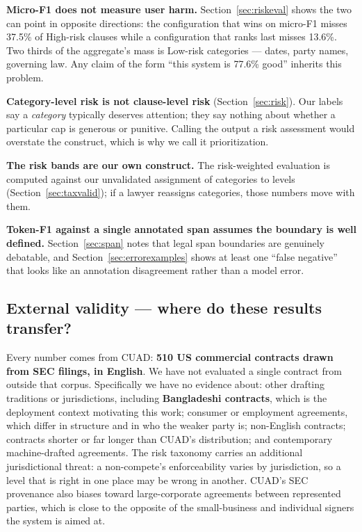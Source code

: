 \textbf{Micro-F1 does not measure user harm.} Section~\ref{sec:riskeval} shows the two can point in opposite directions: the configuration that wins on micro-F1 misses 37.5\% of High-risk clauses while a configuration that ranks last misses 13.6\%. Two thirds of the aggregate's mass is Low-risk categories --- dates, party names, governing law. Any claim of the form ``this system is 77.6\% good'' inherits this problem.

\textbf{Category-level risk is not clause-level risk} (Section~\ref{sec:risk}). Our labels say a \emph{category} typically deserves attention; they say nothing about whether a particular cap is generous or punitive. Calling the output a risk assessment would overstate the construct, which is why we call it prioritization.

\textbf{The risk bands are our own construct.} The risk-weighted evaluation is computed against our unvalidated assignment of categories to levels (Section~\ref{sec:taxvalid}); if a lawyer reassigns categories, those numbers move with them.

\textbf{Token-F1 against a single annotated span assumes the boundary is well defined.} Section~\ref{sec:span} notes that legal span boundaries are genuinely debatable, and Section~\ref{sec:errorexamples} shows at least one ``false negative'' that looks like an annotation disagreement rather than a model error.

\subsection{External validity --- where do these results transfer?}
Every number comes from CUAD: \textbf{510 US commercial contracts drawn from SEC filings, in English}. We have not evaluated a single contract from outside that corpus. Specifically we have no evidence about: other drafting traditions or jurisdictions, including \textbf{Bangladeshi contracts}, which is the deployment context motivating this work; consumer or employment agreements, which differ in structure and in who the weaker party is; non-English contracts; contracts shorter or far longer than CUAD's distribution; and contemporary machine-drafted agreements. The risk taxonomy carries an additional jurisdictional threat: a non-compete's enforceability varies by jurisdiction, so a level that is right in one place may be wrong in another. CUAD's SEC provenance also biases toward large-corporate agreements between represented parties, which is close to the opposite of the small-business and individual signers the system is aimed at.

